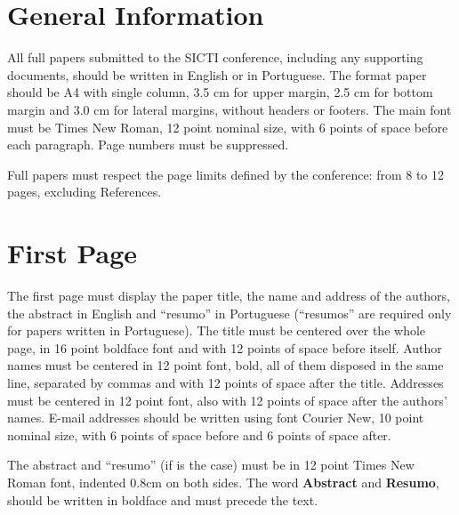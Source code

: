\documentclass[12pt]{article}
\begin{document}
\section{General Information}

All full papers submitted to the SICTI conference,
including any supporting documents, should be written in English or in
Portuguese. The format paper should be A4 with single column, 3.5 cm for upper
margin, 2.5 cm for bottom margin and 3.0 cm for lateral margins, without
headers or footers. The main font must be Times New Roman, 12 point nominal size, with 6
points of space before each paragraph. Page numbers must be suppressed.

Full papers must respect the page limits defined by the conference: from 8 to 12 pages, excluding References.

\section{First Page} \label{sec:firstpage}

The first page must display the paper title, the name and address of the
authors, the abstract in English and ``resumo'' in Portuguese (``resumos'' are
required only for papers written in Portuguese). The title must be centered
over the whole page, in 16 point boldface font and with 12 points of space
before itself. Author names must be centered in 12 point font, bold, all of
them disposed in the same line, separated by commas and with 12 points of
space after the title. Addresses must be centered in 12 point font, also with
12 points of space after the authors' names. E-mail addresses should be
written using font Courier New, 10 point nominal size, with 6 points of space
before and 6 points of space after.

The abstract and ``resumo'' (if is the case) must be in 12 point Times New Roman font,
indented 0.8cm on both sides. The word \textbf{Abstract} and \textbf{Resumo},
should be written in boldface and must precede the text.


\end{document}

